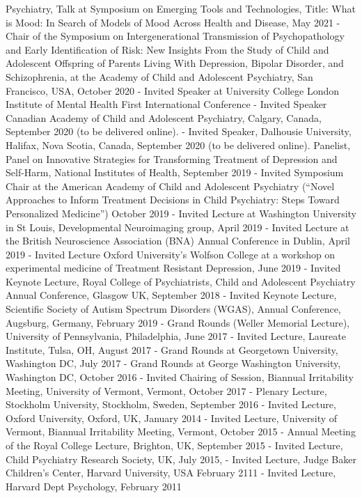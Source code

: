 \documentclass[
]{article}
\begin{document}
Psychiatry, Talk at Symposium on Emerging Tools and Technologies, Title:
What is Mood: In Search of Models of Mood Across Health and Disease, May
2021 - Chair of the Symposium on Intergenerational Transmission of
Psychopathology and Early Identification of Risk: New Insights From the
Study of Child and Adolescent Offspring of Parents Living With
Depression, Bipolar Disorder, and Schizophrenia, at the Academy of Child
and Adolescent Psychiatry, San Francisco, USA, October 2020 - Invited
Speaker at University College London Institute of Mental Health First
International Conference - Invited Speaker Canadian Academy of Child and
Adolescent Psychiatry, Calgary, Canada, September 2020 (to be delivered
online). - Invited Speaker, Dalhousie University, Halifax, Nova Scotia,
Canada, September 2020 (to be delivered online). Panelist, Panel on
Innovative Strategies for Transforming Treatment of Depression and
Self-Harm, National Institutes of Health, September 2019 - Invited
Symposium Chair at the American Academy of Child and Adolescent
Psychiatry (``Novel Approaches to Inform Treatment Decisions in Child
Psychiatry: Steps Toward Personalized Medicine'') October 2019 - Invited
Lecture at Washington University in St Louis, Developmental Neuroimaging
group, April 2019 - Invited Lecture at the British Neuroscience
Association (BNA) Annual Conference in Dublin, April 2019 - Invited
Lecture Oxford University's Wolfson College at a workshop on
experimental medicine of Treatment Resistant Depression, June 2019 -
Invited Keynote Lecture, Royal College of Psychiatrists, Child and
Adolescent Psychiatry Annual Conference, Glasgow UK, September 2018 -
Invited Keynote Lecture, Scientific Society of Autism Spectrum Disorders
(WGAS), Annual Conference, Augsburg, Germany, February 2019 - Grand
Rounds (Weller Memorial Lecture), University of Pennsylvania,
Philadelphia, June 2017 - Invited Lecture, Laureate Institute, Tulsa,
OH, August 2017 - Grand Rounds at Georgetown University, Washington DC,
July 2017 - Grand Rounds at George Washington University, Washington DC,
October 2016 - Invited Chairing of Session, Biannual Irritability
Meeting, University of Vermont, Vermont, October 2017 - Plenary Lecture,
Stockholm University, Stockholm, Sweden, September 2016 - Invited
Lecture, Oxford University, Oxford, UK, January 2014 - Invited Lecture,
University of Vermont, Biannual Irritability Meeting, Vermont, October
2015 - Annual Meeting of the Royal College Lecture, Brighton, UK,
September 2015 - Invited Lecture, Child Psychiatry Research Society, UK,
July 2015, - Invited Lecture, Judge Baker Children's Center, Harvard
University, USA February 2111 - Invited Lecture, Harvard Dept
Psychology, February 2011
\end{document}
